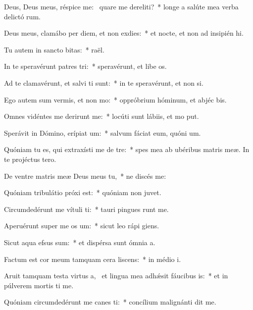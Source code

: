 \item Deus, Deus meus, réspice  me:~\pscross{} quare me dereliti?~* longe a salúte mea verba delictó rum.
\item Deus meus, clamábo per diem, et non exdies:~* et nocte, et non ad insipién hi.
\item Tu autem in sancto bitas:~*  raël.
\item In te speravérunt patres tri:~* speravérunt, et libe os.
\item Ad te clamavérunt, et salvi ti sunt:~* in te speravérunt, et non  si.
\item Ego autem sum vermis, et non mo:~* oppróbrium hóminum, et abjéc bis.
\item Omnes vidéntes me derirunt me:~* locúti sunt lábiis, et mo put.
\item Sperávit in Dómino, erípiat um:~* salvum fáciat eum, quóni  um.
\item Quóniam tu es, qui extraxísti me de tre:~* spes mea ab ubéribus matris meæ. In te projéctus   tero.
\item De ventre matris meæ Deus meus  tu,~* ne discés  me:
\item Quóniam tribulátio próxi est:~* quóniam non   juvet.
\item Circumdedérunt me vítuli ti:~* tauri pingues runt me.
\item Aperuérunt super me os um:~* sicut leo rápi  giens.
\item Sicut aqua efsus sum:~* et dispérsa sunt ómnia  a.
\item Factum est cor meum tamquam cera liscens:~* in médio  i.
\item Aruit tamquam testa virtus a,~\pscross{} et lingua mea adhǽsit fáucibus is:~* et in púlverem mortis ti me.
\item Quóniam circumdedérunt me canes ti:~* concílium malignánti dit me.
